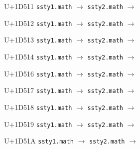 \documentclass{article}
\begin{document}
\begin{substitutions}
\goodbreak

U+1D511  \linebreak
    \texttt{ssty1.math} $\to$  \linebreak
    \texttt{ssty2.math} $\to$  

\goodbreak

U+1D512  \linebreak
    \texttt{ssty1.math} $\to$  \linebreak
    \texttt{ssty2.math} $\to$  

\goodbreak

U+1D513  \linebreak
    \texttt{ssty1.math} $\to$  \linebreak
    \texttt{ssty2.math} $\to$  

\goodbreak

U+1D514  \linebreak
    \texttt{ssty1.math} $\to$  \linebreak
    \texttt{ssty2.math} $\to$  

\goodbreak

U+1D516  \linebreak
    \texttt{ssty1.math} $\to$  \linebreak
    \texttt{ssty2.math} $\to$  

\goodbreak

U+1D517  \linebreak
    \texttt{ssty1.math} $\to$  \linebreak
    \texttt{ssty2.math} $\to$  

\goodbreak

U+1D518  \linebreak
    \texttt{ssty1.math} $\to$  \linebreak
    \texttt{ssty2.math} $\to$  

\goodbreak

U+1D519  \linebreak
    \texttt{ssty1.math} $\to$  \linebreak
    \texttt{ssty2.math} $\to$  

\goodbreak

U+1D51A  \linebreak
    \texttt{ssty1.math} $\to$  \linebreak
    \texttt{ssty2.math} $\to$  


\end{substitutions}
\end{document}
